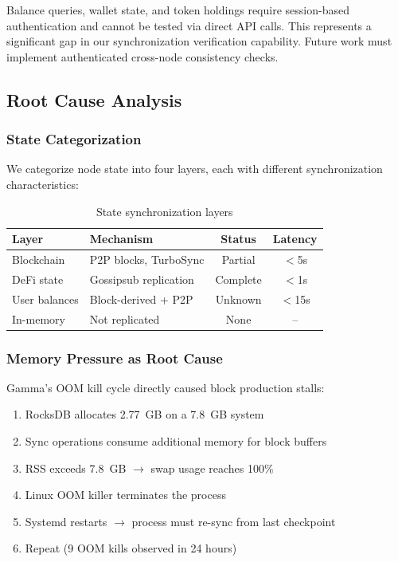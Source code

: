 \documentclass[11pt,a4paper,twocolumn]{article}
\begin{document}
Balance queries, wallet state, and token holdings require session-based
authentication and cannot be tested via direct API calls. This represents
a significant gap in our synchronization verification capability. Future
work must implement authenticated cross-node consistency checks.

\subsection{Root Cause Analysis}

\subsubsection{State Categorization}

We categorize node state into four layers, each with different synchronization
characteristics:

\begin{table}[H]
\centering
\caption{State synchronization layers}
\label{tab:statelayers}
\scriptsize
\begin{tabularx}{\columnwidth}{lXcc}
\toprule
\textbf{Layer} & \textbf{Mechanism} & \textbf{Status} & \textbf{Latency} \\
\midrule
Blockchain    & P2P blocks, TurboSync & Partial & $<$5s \\
DeFi state    & Gossipsub replication  & Complete & $<$1s \\
User balances & Block-derived + P2P    & Unknown  & $<$15s \\
In-memory     & Not replicated         & None     & -- \\
\bottomrule
\end{tabularx}
\end{table}

\subsubsection{Memory Pressure as Root Cause}

Gamma's OOM kill cycle directly caused block production stalls:

\begin{enumerate}[nosep,leftmargin=*]
    \item RocksDB allocates 2.77~GB on a 7.8~GB system
    \item Sync operations consume additional memory for block buffers
    \item RSS exceeds 7.8~GB $\rightarrow$ swap usage reaches 100\%
    \item Linux OOM killer terminates the process
    \item Systemd restarts $\rightarrow$ process must re-sync from last checkpoint
    \item Repeat (9 OOM kills observed in 24 hours)
\end{enumerate}
\end{document}
